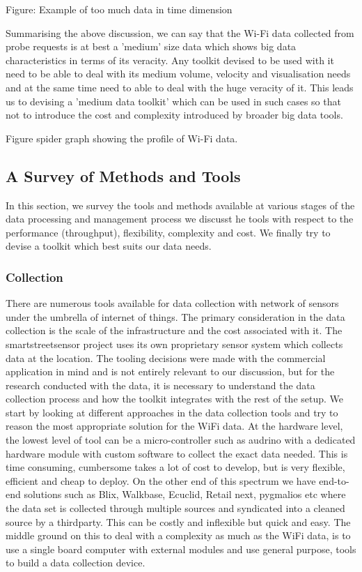 Figure: Example of too much data in time dimension

Summarising the above discussion, we can say that the Wi-Fi data collected from probe requests is at best a 'medium' size data which shows big data characteristics in terms of its veracity.
Any toolkit devised to be used with it need to be able to deal with its medium volume, velocity and visualisation needs and at the same time need to able to deal with the huge veracity of it.
This leads us to devising a 'medium data toolkit' which can be used in such cases so that not to introduce the cost and complexity introduced by broader big data tools.

Figure spider graph showing the profile of Wi-Fi data.

\subsection{A Survey of Methods and Tools}

In this section, we survey the tools and methods available at various stages of the data processing and management process we discusst he tools with respect to the performance (throughput), flexibility, complexity and cost.
We finally try to devise a toolkit which best suits our data needs.


\subsubsection{Collection}

There are numerous tools available for data collection with network of sensors under the umbrella of internet of things.
The primary consideration in the data collection is the scale of the infrastructure and the cost associated with it.
The smartstreetsensor project uses its own proprietary sensor system which collects data at the location.
The tooling decisions were made with the commercial application in mind and is not entirely relevant to our discussion, but for the research conducted with the data, it is necessary to understand the data collection process and how the toolkit integrates with the rest of the setup.
We start by looking at different approaches in the data collection tools and try to reason the most appropriate solution for the WiFi data.
At the hardware level, the lowest level of tool can be a micro-controller such as audrino with a dedicated hardware module with custom software to collect the exact data needed.
This is time consuming, cumbersome takes a lot of cost to develop, but is very flexible, efficient and cheap to deploy.
On the other end of this spectrum we have end-to-end solutions such as Blix, Walkbase, Ecuclid, Retail next, pygmalios etc where the data set is collected through multiple sources and syndicated into a cleaned source by a thirdparty.
This can be costly and inflexible but quick and easy.
The middle ground on this to deal with a complexity as much as the WiFi data, is to use a single board computer with external modules and use general purpose, tools to build a data collection device.

